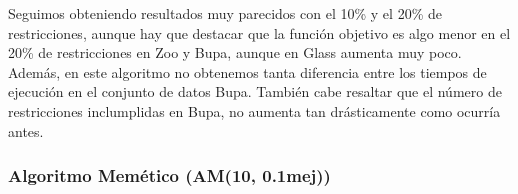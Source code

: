 Seguimos obteniendo resultados muy parecidos con el 10\% y el 20\% de restricciones, aunque hay que destacar que la función objetivo es algo menor en el 20\% de restricciones en Zoo y Bupa, aunque en Glass aumenta muy poco.
Además, en este algoritmo no obtenemos tanta diferencia entre los tiempos de ejecución en el conjunto de datos Bupa. También cabe resaltar que el número de restricciones inclumplidas en Bupa, no aumenta tan drásticamente como ocurría antes.

\subsubsection{Algoritmo Memético (AM(10, 0.1mej))}


\begin{table}[H]
	\tiny

	\begin{adjustwidth}{-1cm}{-1cm}%
	

\end{adjustwidth}
\end{table}
